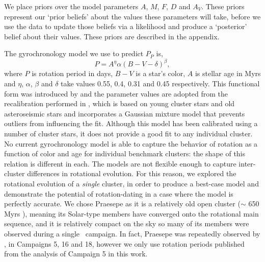 We place priors over the model parameters $A$, $M$, $F$, $D$ and $A_V$.
These priors represent our `prior beliefs' about the values these parameters
will take, before we use the data to update those beliefs via a likelihood and
produce a `posterior' belief about their values.
These priors are described in the appendix.

The gyrochronology model we use to predict $P_P$ is, %
\begin{equation}
    P = A^\eta \alpha (B-V - \delta)^\beta,
\label{eqn:gyro}
\end{equation}
where $P$ is rotation period in days, $B-V$ is a star's color, $A$ is stellar
age in Myrs and $\eta$, $\alpha$, $\beta$ and $\delta$ take values 0.55, 0.4,
0.31 and 0.45 respectively.
This functional form was introduced by \citep{barnes2007} and the parameter
values are adopted from the recalibration performed in \citet{angus2015},
which is based on young cluster stars and old asteroseismic stars and
incorporates a Gaussian mixture model that prevents outliers from influencing
the fit.
Although this model has been calibrated using a number of cluster stars, it
does not provide a good fit to any individual cluster.
No current gyrochronology model is able to capture the behavior of rotation as
a function of color and age for individual benchmark clusters: the shape of
this relation is different in each.
The models are not flexible enough to capture inter-cluster differences in
rotational evolution.
For this reason, we explored the rotational evolution of a {\it single}
cluster, in order to produce a best-case model and demonstrate the potential
of rotation-dating in a case where the model is perfectly accurate.
We chose Praesepe as it is a relatively old open cluster ($\sim$ 650 Myrs
), meaning its Solar-type members have converged onto the
rotational main sequence, and it is relatively compact on the sky so many of
its members were observed during a single \ktwo\ campaign.
In fact, Praesepe was repeatedly observed by \ktwo, in Campaigns 5, 16 and 18,
however we only use rotation periods published from the analysis of Campaign 5
in this work.


